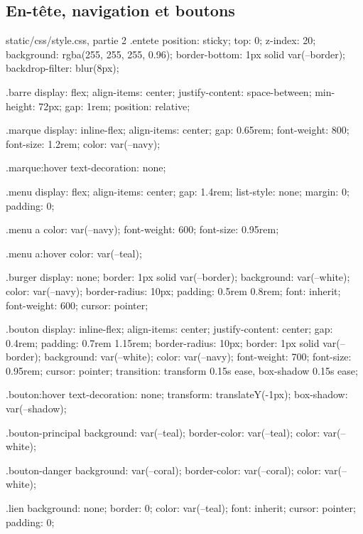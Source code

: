 \subsection{En-tête, navigation et boutons}

\begin{codebox}[css]{static/css/style.css, partie 2}
.entete {
  position: sticky;
  top: 0;
  z-index: 20;
  background: rgba(255, 255, 255, 0.96);
  border-bottom: 1px solid var(--border);
  backdrop-filter: blur(8px);
}

.barre {
  display: flex;
  align-items: center;
  justify-content: space-between;
  min-height: 72px;
  gap: 1rem;
  position: relative;
}

.marque {
  display: inline-flex;
  align-items: center;
  gap: 0.65rem;
  font-weight: 800;
  font-size: 1.2rem;
  color: var(--navy);
}

.marque:hover {
  text-decoration: none;
}

.menu {
  display: flex;
  align-items: center;
  gap: 1.4rem;
  list-style: none;
  margin: 0;
  padding: 0;
}

.menu a {
  color: var(--navy);
  font-weight: 600;
  font-size: 0.95rem;
}

.menu a:hover {
  color: var(--teal);
}

.burger {
  display: none;
  border: 1px solid var(--border);
  background: var(--white);
  color: var(--navy);
  border-radius: 10px;
  padding: 0.5rem 0.8rem;
  font: inherit;
  font-weight: 600;
  cursor: pointer;
}

.bouton {
  display: inline-flex;
  align-items: center;
  justify-content: center;
  gap: 0.4rem;
  padding: 0.7rem 1.15rem;
  border-radius: 10px;
  border: 1px solid var(--border);
  background: var(--white);
  color: var(--navy);
  font-weight: 700;
  font-size: 0.95rem;
  cursor: pointer;
  transition: transform 0.15s ease, box-shadow 0.15s ease;
}

.bouton:hover {
  text-decoration: none;
  transform: translateY(-1px);
  box-shadow: var(--shadow);
}

.bouton-principal {
  background: var(--teal);
  border-color: var(--teal);
  color: var(--white);
}

.bouton-danger {
  background: var(--coral);
  border-color: var(--coral);
  color: var(--white);
}

.lien {
  background: none;
  border: 0;
  color: var(--teal);
  font: inherit;
  cursor: pointer;
  padding: 0;
}
\end{codebox}


